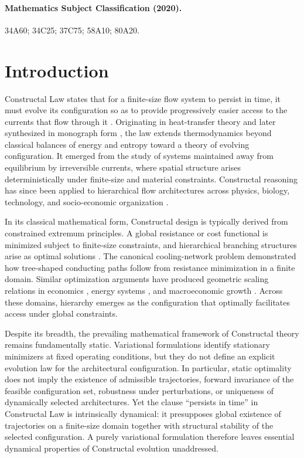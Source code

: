 \documentclass[12pt]{article}
\theoremstyle{plain}
\theoremstyle{definition}
\theoremstyle{remark}
\begin{document}
\paragraph{Mathematics Subject Classification (2020).}
34A60; 34C25; 37C75; 58A10; 80A20.



\section{Introduction}
\label{sec:introduction}

Constructal Law states that for a finite-size flow system to persist in time, it must evolve its configuration so as to provide progressively easier access to the currents that flow through it \cite{Bejan2000Book,BejanLorente2011,BejanLorente2013JAP}. Originating in heat-transfer theory \cite{Bejan1997IJHMT} and later synthesized in monograph form \cite{Bejan2000Book,Bejan2007Book}, the law extends thermodynamics beyond classical balances of energy and entropy toward a theory of evolving configuration. It emerged from the study of systems maintained away from equilibrium by irreversible currents, where spatial structure arises deterministically under finite-size and material constraints. Constructal reasoning has since been applied to hierarchical flow architectures across physics, biology, technology, and socio-economic organization \cite{BejanLorente2011,RochaLorenteBejan2012,LorenteBejan2019}.

In its classical mathematical form, Constructal design is typically derived from constrained extremum principles. A global resistance or cost functional is minimized subject to finite-size constraints, and hierarchical branching structures arise as optimal solutions \cite{BejanTsatsaronisMoran1996}. The canonical cooling-network problem \cite{Bejan1997IJHMT} demonstrated how tree-shaped conducting paths follow from resistance minimization in a finite domain. Similar optimization arguments have produced geometric scaling relations in economics \cite{BejanBadescuDeVos2000AE,BejanBadescuDeVos2000ECM}, energy systems \cite{BejanLorente2007}, and macroeconomic growth \cite{BejanErreraGunes2020}. Across these domains, hierarchy emerges as the configuration that optimally facilitates access under global constraints.

Despite its breadth, the prevailing mathematical framework of Constructal theory remains fundamentally static. Variational formulations identify stationary minimizers at fixed operating conditions, but they do not define an explicit evolution law for the architectural configuration. In particular, static optimality does not imply the existence of admissible trajectories, forward invariance of the feasible configuration set, robustness under perturbations, or uniqueness of dynamically selected architectures. Yet the clause ``persists in time'' in Constructal Law is intrinsically dynamical: it presupposes global existence of trajectories on a finite-size domain together with structural stability of the selected configuration. A purely variational formulation therefore leaves essential dynamical properties of Constructal evolution unaddressed.
\end{document}

